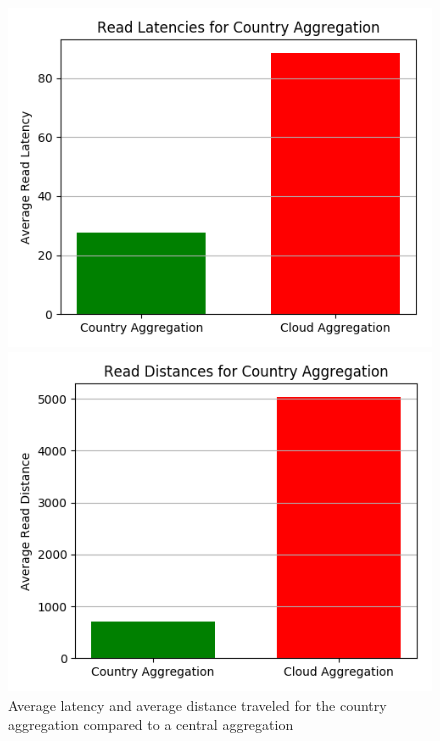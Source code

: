 \begin{figure}[H]
\begin{minipage}{0.49\textwidth}
\centering
\includegraphics[width=1\linewidth]{Figures/Evaluation/read-by-latency-Country-Aggregation.png}
\end{minipage}
\hfill
\begin{minipage}{0.49\textwidth}
\centering
\includegraphics[width=1\linewidth]{Figures/Evaluation/read-by-distance-Country-Aggregation.png}
\end{minipage}
\label{fig:read-by-country}
\caption{Average latency and average distance traveled for the country aggregation compared to a central aggregation}
\end{figure}

